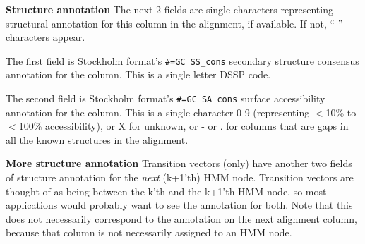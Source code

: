 \begin{wideitem}
\item[\textbf{Structure annotation}] The next 2
fields are single characters representing structural annotation
for this column in the alignment, if available. If not,
``-'' characters appear.

The first field is Stockholm format's \verb+#=GC SS_cons+ secondary
structure consensus annotation for the column. This is a single letter
DSSP code.

The second field is Stockholm format's \verb+#=GC SA_cons+ surface
accessibility annotation for the column. This is a single character
0-9 (representing $<$10\% to $<$100\% accessibility), or X for
unknown, or - or . for columns that are gaps in all the known
structures in the alignment.

\item[\textbf{More structure annotation}] Transition vectors
(only) have another two fields of structure annotation for the 
\emph{next} (k+1'th) HMM node. Transition vectors are thought of as
being between the k'th and the k+1'th HMM node, so most applications
would probably want to see the annotation for both.  Note that this
does not necessarily correspond to the annotation on the next
alignment column, because that column is not necessarily assigned to
an HMM node.

\end{wideitem}



